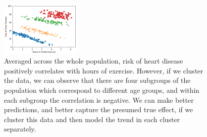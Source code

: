 \begin{figure}[h]
  \centering
  \includegraphics[width=0.35\textwidth]{figures/simpsons_color.png}
  \caption{Averaged across the whole population, risk of heart
    disease positively correlates with hours of exercise. However,
    if we cluster the data, we can observe that there are four
    subgroups of the population which correspond to different age
    groups, and within each subgroup the correlation is negative. We
    can make better predictions, and better capture the presumed
    true effect, if we cluster this data and then model the trend in
    each cluster separately.}
  \label{fig:simpsons_color}
\end{figure}






